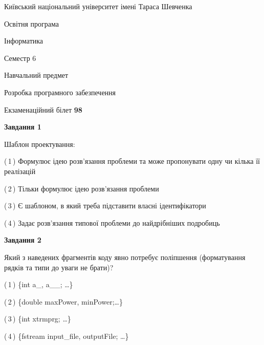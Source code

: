 \documentclass[10pt, ukrainian]{article}
\begin{document}
{{\begin {small}\par
{ \center  Київський національний університет імені Тараса Шевченка \par}
{\parbox {5 cm}{Освітня програма \hfill}{\parbox {7 cm}{Інформатика \hfill}}\parbox {6 cm}{\hfill Семестр 6}}\par
{\parbox {5 cm} {Навчальний предмет \hfill}\parbox {7 cm}{Розробка програмного забезпечення \hfill}\parbox {6cm}{\hfill}\par}\vspace{-7pt} \end{small}}{\center Екзаменаційний білет \No \textbf
{ 98 }\par}}
{
\begin {large}
{\begin {center}\textbf{Завдання 1}\end {center}}\par
Шаблон проектування:\par
\vspace{2mm}



(\,1\,) Формулює ідею розв'язання проблеми та може пропонувати одну чи кілька її реалізацій%



(\,2\,) Тільки формулює ідею розв'язання проблеми%



(\,3\,) Є шаблоном, в який треба підставити власні ідентифікатори%



(\,4\,) Задає розв'язання типової проблеми до найдрібніших подробиць%


{\begin {center}\textbf{Завдання 2}\end {center}}\par
Який з наведених фрагментів коду явно потребує поліпшення (форматування рядків та типи до уваги не брати)?\par
\vspace{2mm}



(\,1\,) \{int a\_, a\_\_; …\}%



(\,2\,) \{double maxPower, minPower;…\} %



(\,3\,) \{int xtrmprg; …\}%



(\,4\,) \{fstream input\_file, outputFile; …\}%



\end{large}}
\end{document}
